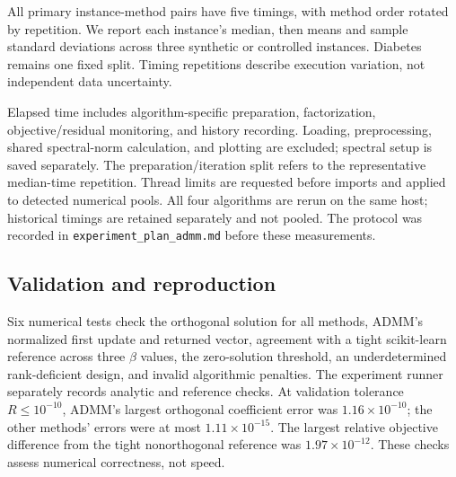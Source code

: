 \documentclass[10pt,letterpaper]{article}
\begin{document}
All primary instance-method pairs have five timings, with method order rotated by repetition. We report each instance's median, then means and sample standard deviations across three synthetic or controlled instances. Diabetes remains one fixed split. Timing repetitions describe execution variation, not independent data uncertainty.

Elapsed time includes algorithm-specific preparation, factorization, objective/residual monitoring, and history recording. Loading, preprocessing, shared spectral-norm calculation, and plotting are excluded; spectral setup is saved separately. The preparation/iteration split refers to the representative median-time repetition. Thread limits are requested before imports and applied to detected numerical pools. All four algorithms are rerun on the same host; historical timings are retained separately and not pooled. The protocol was recorded in \texttt{experiment\_plan\_admm.md} before these measurements.

\subsection{Validation and reproduction}\label{sec:reproducibility}
Six numerical tests check the orthogonal solution for all methods, ADMM's normalized first update and returned vector, agreement with a tight scikit-learn reference across three $\beta$ values, the zero-solution threshold, an underdetermined rank-deficient design, and invalid algorithmic penalties. The experiment runner separately records analytic and reference checks. At validation tolerance $R\leq10^{-10}$, ADMM's largest orthogonal coefficient error was $1.16\times10^{-10}$; the other methods' errors were at most $1.11\times10^{-15}$. The largest relative objective difference from the tight nonorthogonal reference was $1.97\times10^{-12}$. These checks assess numerical correctness, not speed.
\end{document}
